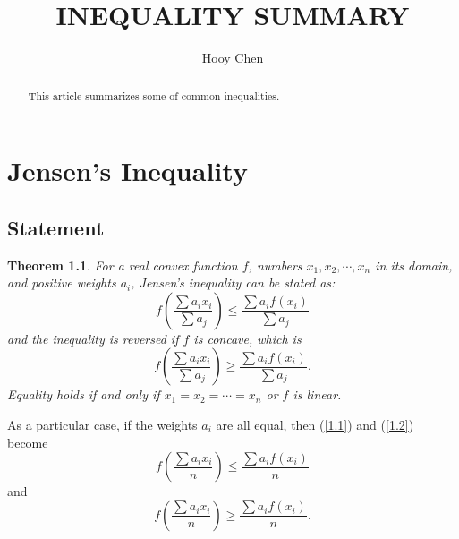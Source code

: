 \documentclass[a4paper]{report}
\begin{document}
	
\renewcommand{\arraystretch}{1.2}
\newcommand{\upcite}[1]{\textsuperscript{\cite{#1}}}

\theoremstyle{thr}
\newtheorem{thr}{Theorem}[section]
\newtheorem{myex}{Example}[section]
\newtheorem{defi}{Definition}[section]
\linespread{2} 

\title{\bf{INEQUALITY SUMMARY}}
\author{Hooy Chen}
\maketitle
\newpage

\begin{abstract}
	\setlength{\parindent}{0pt} \setlength{\parskip}{1.5ex plus 0.5ex
		minus 0.2ex} %
    This article summarizes some of common inequalities.
\end{abstract}
\newpage

\tableofcontents
\newpage


\chapter{Jensen's Inequality}
\section{Statement}
\begin{thr}
For a real convex function $f$, numbers $x_1,x_2,\cdots ,x_n$ in its domain, and positive weights $a_i$, Jensen's inequality can be stated as:
    \begin{equation}
    f\left(\frac{\sum a_ix_i}{\sum a_j}\right)\leqslant
    \frac{\sum a_if(x_i)}{\sum a_j}
\label{1.1}
    \end{equation}
and the inequality is reversed if $f$ is concave, which is
    \begin{equation}
    f\left(\frac{\sum a_ix_i}{\sum a_j}\right)\geqslant
    \frac{\sum a_if(x_i)}{\sum a_j}.
\label{1.2}
    \end{equation}
Equality holds if and only if $x_1=x_2=\cdots=x_n$ or $f$ is linear\upcite{DavidChandler}.\\
\end{thr}
As a particular case, if the weights $a_i$ are all equal, then 
(\ref{1.1}) and (\ref{1.2}) become  
    \begin{equation}
    f\left(\frac{\sum a_ix_i}{n}\right)\leqslant
    \frac{\sum a_if(x_i)}{n}
    \end{equation}
and
    \begin{equation}
    f\left(\frac{\sum a_ix_i}{n}\right)\geqslant
    \frac{\sum a_if(x_i)}{n}.
    \end{equation}      
\end{document}
